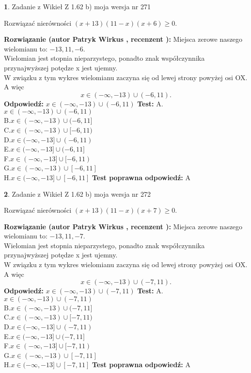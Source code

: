 \documentclass[12pt, a4paper]{article}
\theoremstyle{definition} %
\newtheorem{zad}{}
\newcommand{\zadStart}[1]{\begin{zad}#1\newline}
\newcommand{\zadStop}{\end{zad}}
\newcommand{\rozwStart}[2]{\noindent \textbf{Rozwiązanie (autor #1 , recenzent #2): }\newline}
\newcommand{\rozwStop}{\newline}
\newcommand{\odpStart}{\noindent \textbf{Odpowiedź:}\newline}
\newcommand{\odpStop}{\newline}
\newcommand{\testStart}{\noindent \textbf{Test:}\newline}
\newcommand{\testStop}{\newline}
\newcommand{\kluczStart}{\noindent \textbf{Test poprawna odpowiedź:}\newline}
\newcommand{\kluczStop}{\newline}
\begin{document}
\zadStart{Zadanie z Wikieł Z 1.62 b) moja wersja nr 271}

Rozwiązać nierówności $(x+13)(11-x)(x+6)\ge0$.
\zadStop
\rozwStart{Patryk Wirkus}{}
Miejsca zerowe naszego wielomianu to: $-13, 11, -6$.\\
Wielomian jest stopnia nieparzystego, ponadto znak współczynnika przy\linebreak najwyższej potędze x jest ujemny.\\ W związku z tym wykres wielomianu zaczyna się od lewej strony powyżej osi OX. A więc $$x \in (-\infty,-13) \cup (-6,11).$$
\rozwStop
\odpStart
$x \in (-\infty,-13) \cup (-6,11)$
\odpStop
\testStart
A.$x \in (-\infty,-13) \cup (-6,11)$\\
B.$x \in (-\infty,-13) \cup (-6,11]$\\
C.$x \in (-\infty,-13) \cup [-6,11)$\\
D.$x \in (-\infty,-13] \cup (-6,11)$\\
E.$x \in (-\infty,-13] \cup (-6,11]$\\
F.$x \in (-\infty,-13] \cup [-6,11)$\\
G.$x \in (-\infty,-13) \cup [-6,11]$\\
H.$x \in (-\infty,-13] \cup [-6,11]$
\testStop
\kluczStart
A
\kluczStop



\zadStart{Zadanie z Wikieł Z 1.62 b) moja wersja nr 272}

Rozwiązać nierówności $(x+13)(11-x)(x+7)\ge0$.
\zadStop
\rozwStart{Patryk Wirkus}{}
Miejsca zerowe naszego wielomianu to: $-13, 11, -7$.\\
Wielomian jest stopnia nieparzystego, ponadto znak współczynnika przy\linebreak najwyższej potędze x jest ujemny.\\ W związku z tym wykres wielomianu zaczyna się od lewej strony powyżej osi OX. A więc $$x \in (-\infty,-13) \cup (-7,11).$$
\rozwStop
\odpStart
$x \in (-\infty,-13) \cup (-7,11)$
\odpStop
\testStart
A.$x \in (-\infty,-13) \cup (-7,11)$\\
B.$x \in (-\infty,-13) \cup (-7,11]$\\
C.$x \in (-\infty,-13) \cup [-7,11)$\\
D.$x \in (-\infty,-13] \cup (-7,11)$\\
E.$x \in (-\infty,-13] \cup (-7,11]$\\
F.$x \in (-\infty,-13] \cup [-7,11)$\\
G.$x \in (-\infty,-13) \cup [-7,11]$\\
H.$x \in (-\infty,-13] \cup [-7,11]$
\testStop
\kluczStart
A
\kluczStop
\end{document}
